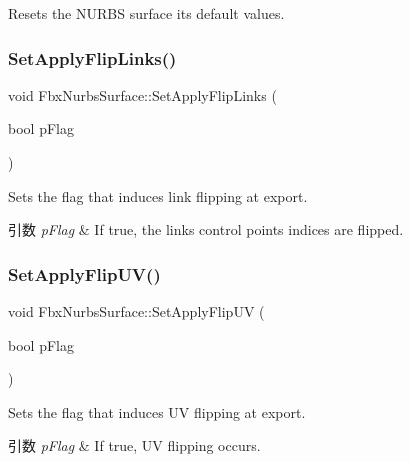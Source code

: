 Resets the N\+U\+R\+BS surface its default values. 

\mbox{\label{class_fbx_nurbs_surface_aa8752b1a2895f41b1ce14d3a045804df}} 
\subsubsection{\texorpdfstring{Set\+Apply\+Flip\+Links()}{SetApplyFlipLinks()}}
{\footnotesize\ttfamily void Fbx\+Nurbs\+Surface\+::\+Set\+Apply\+Flip\+Links (\begin{DoxyParamCaption}\item[{bool}]{p\+Flag }\end{DoxyParamCaption})}

Sets the flag that induces link flipping at export. 
\begin{DoxyParams}{引数}
{\em p\+Flag} & If {\ttfamily true}, the links control points indices are flipped. \\
\hline
\end{DoxyParams}
\mbox{\label{class_fbx_nurbs_surface_aa42ffe0c0aa1e807198cb554c11f3441}} 
\subsubsection{\texorpdfstring{Set\+Apply\+Flip\+U\+V()}{SetApplyFlipUV()}}
{\footnotesize\ttfamily void Fbx\+Nurbs\+Surface\+::\+Set\+Apply\+Flip\+UV (\begin{DoxyParamCaption}\item[{bool}]{p\+Flag }\end{DoxyParamCaption})}

Sets the flag that induces UV flipping at export. 
\begin{DoxyParams}{引数}
{\em p\+Flag} & If {\ttfamily true}, UV flipping occurs. \\
\hline
\end{DoxyParams}
\mbox{\label{class_fbx_nurbs_surface_a0fc7b33859f68a6ad3f72e21162f9f6d}} 
